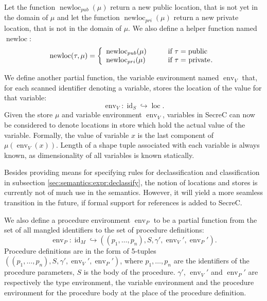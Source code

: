 \documentclass[a4paper, 10pt, draft]{report}
\DeclareMathOperator*{\env}{env}
\newcommand{\mycode}[1]{\ensuremath{\mbox{\lstinline{#1}}}}
\begin{document}
Let the function $\operatorname{newloc}_{pub}\left(\mu\right)$ return a new
public location, that is not yet in the domain of $\mu$ and let the function
$\operatorname{newloc}_{pri}\left(\mu\right)$ return a new private location,
that is not in the domain of $\mu$. We also define a helper function named
$\operatorname{newloc}$:
\[
 \operatorname{newloc}\!\left(\tau, \mu\right) = \left\{
    \begin{array}{ll}
       \operatorname{newloc}_{pub}\!\left(\mu\right) & \qquad \mbox{if}\ \tau = \mycode{public} \\
       \operatorname{newloc}_{pri}\!\left(\mu\right) & \qquad \mbox{if}\ \tau = \mycode{private}. \\
    \end{array}
 \right.
\]

We define another partial function, the variable environment named
$\operatorname{env}_V$ that, for each scanned identifier denoting a variable,
  stores the location of the value for that variable:
\[
\operatorname{env}_V : \operatorname{id}_S \hookrightarrow \operatorname{loc}.
\]
Given the store $\mu$ and variable environment $\operatorname{env}_V$,
variables in SecreC can now be considered to denote locations in store which
hold the actual value of the variable. Formally, the value of variable $x$ is
the last component of $\mu\!\left( \env_V\!\left( x \right) \right)$. Length of a shape
tuple associated with each variable is always known, as dimensionality of all
variables is known statically.

Besides providing means for specifying rules for declassification and
classification in subsection \ref{sec:semantics:expr:declassify}, the notion of
locations and stores is currently not of much use in the semantics. However, it
will yield a more seamless transition in the future, if formal support for
references is added to SecreC.

We also define a procedure environment $\operatorname{env}_P$ to be a partial
function from the set of all mangled identifiers to the set of procedure
definitions:
\[
\operatorname{env}_P : \operatorname{id}_M \hookrightarrow \left(\left(p_1, \ldots, p_n\right), S, \gamma', \operatorname{env}_V', \operatorname{env}_P' \right).
\]
Procedure definitions are in the form of 5-tuples $\left(\left(p_1, \ldots,
p_n\right), S, \gamma', \operatorname{env}_V', \operatorname{env}_P'
\right)$, where $p_1, \ldots, p_n$ are the identifiers of the procedure
parameters, $S$ is the body of the procedure. $\gamma'$,
$\operatorname{env}_V'$ and $\operatorname{env}_P'$ are respectively the type
environment, the variable environment and the procedure environment for the
procedure body at the place of the procedure definition.
\end{document}
